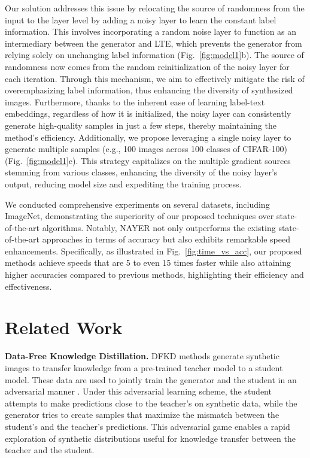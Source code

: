 \documentclass{article} %
\begin{document}
Our solution addresses this issue by relocating the source of randomness from the input to the layer level by adding a noisy layer to learn the constant label information.  This involves incorporating a random noise layer to function as an intermediary between the generator and LTE, which prevents the generator from relying solely on unchanging label information (Fig.~\ref{fig:model1}b). The source of randomness now comes from the random reinitialization of the noisy layer for each iteration. Through this mechanism, we aim to effectively mitigate the risk of overemphasizing label information, thus enhancing the diversity of synthesized images. Furthermore, thanks to the inherent ease of learning label-text embeddings, regardless of how it is initialized, the noisy layer can consistently generate high-quality samples in just a few steps, thereby maintaining the method's efficiency. Additionally, we propose leveraging a single noisy layer to generate multiple samples (e.g., 100 images across 100 classes of CIFAR-100) (Fig.~\ref{fig:model1}c). This strategy capitalizes on the multiple gradient sources stemming from various classes, enhancing the diversity of the noisy layer's output, reducing model size and expediting the training process.

We conducted comprehensive experiments on several datasets, including ImageNet, demonstrating the superiority of our proposed techniques over state-of-the-art algorithms. Notably, NAYER not only outperforms the existing state-of-the-art approaches in terms of accuracy but also exhibits remarkable speed enhancements. Specifically, as illustrated in Fig.~\ref{fig:time_vs_acc}, our proposed methods achieve speeds that are 5 to even 15 times faster while also attaining higher accuracies compared to previous methods, highlighting their efficiency and effectiveness.

\section{Related Work}
\textbf{Data-Free Knowledge Distillation.} DFKD methods generate synthetic images to transfer knowledge from a pre-trained teacher model to a student model. These data are used to jointly train the generator and the student in an adversarial manner \citep{zskd,zskt}. Under this adversarial learning scheme, the student attempts to make predictions close to the teacher’s on synthetic data, while the generator tries to create samples that maximize the mismatch between the student’s and the teacher’s predictions. This adversarial game enables a rapid exploration of synthetic distributions useful for knowledge transfer between the teacher and the student. 
\end{document}
